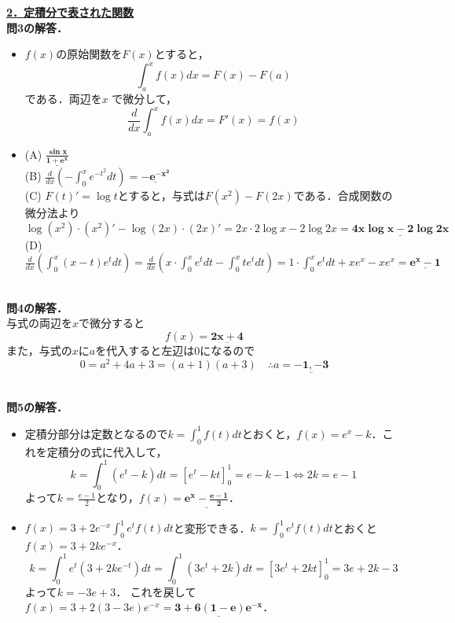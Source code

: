\documentclass[a4paper,11pt]{ltjsarticle}
\begin{document}
\noindent \underline{{\large{\textbf{2．定積分で表された関数}}}}
　\\
\noindent\textbf{問3の解答．}\\[5pt]
\begin{itemize}
    \item [(1)]$f(x)$の原始関数を$F(x)$とすると，
    \[\int_a^x f(x)dx=F(x)-F(a)\]
    である．両辺を$x$ で微分して，
        \[\frac{d}{dx}\int_a^x f(x)dx=F'(x)=f(x)\]
    \item [(2)]
    (A) $\displaystyle{\underline{\boldsymbol{\frac{\sin x}{1+e^x}}}}$ \\
    (B) $\displaystyle{\frac{d}{dx}\left(-\int_0^x e^{-t^2}dt\right)=\underline{\boldsymbol{-e^{-x^2}}}}$ \\
    (C) $\displaystyle{F(t)'=\log t}$とすると，与式は$\displaystyle{F(x^2)-F(2x)}$である．合成関数の微分法より
    \[\log(x^2)\cdot(x^2)'-\log(2x)\cdot(2x)'=2x\cdot 2\log x-2\log 2x=\underline{\boldsymbol{4x\log x-2\log 2x}}\]
    (D) $\displaystyle{\frac{d}{dx}\left(\int_0^x (x-t)e^{t}dt\right)=\frac{d}{dx}\left(x\cdot\int_0^x e^{t}dt-\int_0^xte^tdt\right)=1\cdot\int_0^x e^tdt+x e^x-xe^x= \underline{\boldsymbol{e^x-1}}}$\\

\end{itemize}
　\\
\noindent\textbf{問4の解答．}\\[5pt]
与式の両辺を$\displaystyle{x}$で微分すると
\[f(x)=\underline{\boldsymbol{2x+4}}\]
また，与式の$\displaystyle{x}$に$\displaystyle{a}$を代入すると左辺は0になるので
\[0=a^2+4a+3=(a+1)(a+3) \quad \therefore a=\underline{\boldsymbol{-1,-3}}\]
　

\noindent\textbf{問5の解答．}
    \begin{itemize}
        \item [(1)]定積分部分は定数となるので$\displaystyle{k=\int_0^1 f(t)dt}$とおくと，$\displaystyle{f(x)=e^x-k}$．これを定積分の式に代入して，
        \[k=\int_0^1(e^t-k)dt=[e^t-kt]_0^1=e-k-1 \iff 2k=e-1\]
        よって$\displaystyle{k=\frac{e-1}{2}}$となり，$\displaystyle{f(x)=\underline{\boldsymbol{e^x-\frac{e-1}{2}}}}$．
        \item [(2)]$\displaystyle{f(x)=3+2e^{-x}\int_0^1e^tf(t)dt}$と変形できる．$\displaystyle{k=\int_0^1e^tf(t)dt}$とおくと$\displaystyle{f(x)=3+2ke^{-x}}$．
        \[k=\int_0^1e^t(3+2ke^{-t})dt=\int_0^1(3e^t+2k)dt=[3e^t+2kt]_0^1=3e+2k-3\]
        よって$\displaystyle{k=-3e+3}$．
        これを戻して$\displaystyle{f(x)=3+2(3-3e)e^{-x}=\underline{\boldsymbol{3+6(1-e)e^{-x}}}}$．
    \end{itemize}
\end{document}

